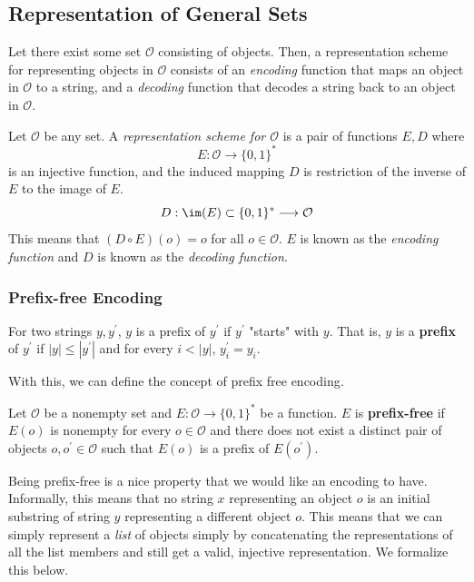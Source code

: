 \documentclass{article}
\begin{document}
  \subsection{Representation of General Sets}
  Let there exist some set $\mathcal{O}$ consisting of objects. Then, a representation scheme for representing objects in $\mathcal{O}$ consists of an \textit{encoding} function that maps an object in $\mathcal{O}$ to a string, and a \textit{decoding} function that decodes a string back to an object in $\mathcal{O}$. 

  \begin{definition}
  Let $\mathcal{O}$ be any set. A \textit{representation scheme for $\mathcal{O}$} is a pair of functions $E, D$ where 
  \[E: \mathcal{O} \longrightarrow \{0,1\}^*\]
  is an injective function, and the induced mapping $D$ is restriction of the inverse of $E$ to the image of $E$. 
  \[D: \im(E) \subset \{0,1\}^* \longrightarrow \mathcal{O}\]
  This means that $(D \circ E) (o) = o$ for all $o \in \mathcal{O}$. $E$ is known as the \textit{encoding function} and $D$ is known as the \textit{decoding function}. 
  \end{definition}

  \subsubsection{Prefix-free Encoding}
  \begin{definition}[Prefix]
  For two strings $y, y^\prime$, $y$ is a prefix of $y^\prime$ if $y^\prime$ "starts" with $y$. That is, $y$ is a \textbf{prefix} of $y^\prime$ if $|y| \leq |y^\prime|$ and for every $i<|y|$, $y_i^\prime = y_i$. 
  \end{definition}

  With this, we can define the concept of prefix free encoding. 

  \begin{definition}
  Let $\mathcal{O}$ be a nonempty set and $E: \mathcal{O} \longrightarrow \{0,1\}^*$ be a function. $E$ is \textbf{prefix-free} if $E(o)$ is nonempty for every $o \in \mathcal{O}$ and there does not exist a distinct pair of objects $o, o^\prime \in \mathcal{O}$ such that $E(o)$ is a prefix of $E(o^\prime)$. 
  \end{definition}

  Being prefix-free is a nice property that we would like an encoding to have. Informally, this means that no string $x$ representing an object $o$ is an initial substring of string $y$ representing a different object $o$. This means that we can simply represent a \textit{list} of objects simply by concatenating the representations of all the list members and still get a valid, injective representation. We formalize this below.
\end{document}

